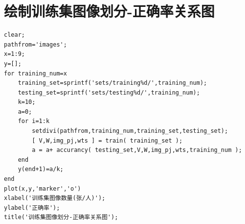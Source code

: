 \documentclass[a4paper]{ctexart}
\begin{document}
\section{绘制训练集图像划分-正确率关系图}\label{prog:绘制训练集图像划分-正确率关系图}
\begin{lstlisting}
clear;
pathfrom='images';
x=1:9;
y=[];
for training_num=x
    training_set=sprintf('sets/training%d/',training_num);
    testing_set=sprintf('sets/testing%d/',training_num);
    k=10;
    a=0;
    for i=1:k
        setdivi(pathfrom,training_num,training_set,testing_set);
        [ V,W,img_pj,wts ] = train( training_set );
        a = a+ accurancy( testing_set,V,W,img_pj,wts,training_num );
    end
    y(end+1)=a/k;
end
plot(x,y,'marker','o')
xlabel('训练集图像数量(张/人)');
ylabel('正确率');
title('训练集图像划分-正确率关系图');
\end{lstlisting}
\end{document}
